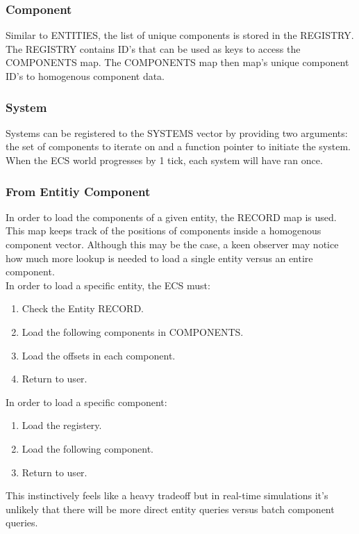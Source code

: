\subsubsection{Component}
Similar to ENTITIES, the list of unique components is stored in the REGISTRY. The REGISTRY contains ID's that can be used as keys to access the COMPONENTS map. The COMPONENTS map then map's unique component ID's to homogenous component data. 

\subsubsection{System}
Systems can be registered to the SYSTEMS vector by providing two arguments: the set of components to iterate on and a function pointer to initiate the system. When the ECS world progresses by 1 tick, each system will have ran once.

\subsubsection{From Entitiy \textrightarrow{} Component}
In order to load the components of a given entity, the RECORD map is used. This map keeps track of the positions of components inside a homogenous component vector. Although this may be the case, a keen observer may notice how much more lookup is needed to load a single entity versus an entire component. \\

In order to load a specific entity, the ECS must:

\begin{enumerate}
    \item Check the Entity RECORD.
    \item Load the following components in COMPONENTS.
    \item Load the offsets in each component.
    \item Return to user.
\end{enumerate}

In order to load a specific component:

\begin{enumerate}
    \item Load the registery.
    \item Load the following component.
    \item Return to user.
\end{enumerate}

This instinctively feels like a heavy tradeoff but in real-time simulations it's unlikely that there will be more direct entity queries versus batch component queries.


